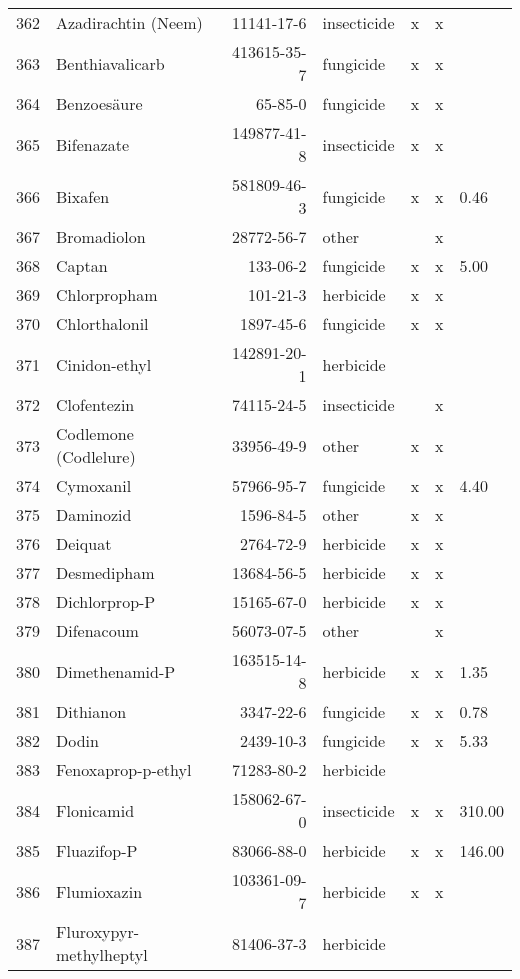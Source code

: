 \begin{longtable}{lp{3cm}rlp{0.5cm}p{0.5cm}p{1cm}}
  362 & Azadirachtin (Neem) & 11141-17-6 & insecticide & x & x &  \\ 
  363 & Benthiavalicarb & 413615-35-7 & fungicide & x & x &  \\ 
  364 & Benzoesäure & 65-85-0 & fungicide & x & x &  \\ 
  365 & Bifenazate & 149877-41-8 & insecticide & x & x &  \\ 
  366 & Bixafen & 581809-46-3 & fungicide & x & x & 0.46 \\ 
  367 & Bromadiolon & 28772-56-7 & other &  & x &  \\ 
  368 & Captan & 133-06-2 & fungicide & x & x & 5.00 \\ 
  369 & Chlorpropham & 101-21-3 & herbicide & x & x &  \\ 
  370 & Chlorthalonil & 1897-45-6 & fungicide & x & x &  \\ 
  371 & Cinidon-ethyl & 142891-20-1 & herbicide &  &  &  \\ 
  372 & Clofentezin & 74115-24-5 & insecticide &  & x &  \\ 
  373 & Codlemone (Codlelure) & 33956-49-9 & other & x & x &  \\ 
  374 & Cymoxanil & 57966-95-7 & fungicide & x & x & 4.40 \\ 
  375 & Daminozid & 1596-84-5 & other & x & x &  \\ 
  376 & Deiquat & 2764-72-9 & herbicide & x & x &  \\ 
  377 & Desmedipham & 13684-56-5 & herbicide & x & x &  \\ 
  378 & Dichlorprop-P & 15165-67-0 & herbicide & x & x &  \\ 
  379 & Difenacoum & 56073-07-5 & other &  & x &  \\ 
  380 & Dimethenamid-P & 163515-14-8 & herbicide & x & x & 1.35 \\ 
  381 & Dithianon & 3347-22-6 & fungicide & x & x & 0.78 \\ 
  382 & Dodin & 2439-10-3 & fungicide & x & x & 5.33 \\ 
  383 & Fenoxaprop-p-ethyl & 71283-80-2 & herbicide &  &  &  \\ 
  384 & Flonicamid & 158062-67-0 & insecticide & x & x & 310.00 \\ 
  385 & Fluazifop-P & 83066-88-0 & herbicide & x & x & 146.00 \\ 
  386 & Flumioxazin & 103361-09-7 & herbicide & x & x &  \\ 
  387 & Fluroxypyr-methylheptyl & 81406-37-3 & herbicide &  &  &  \\ 

\end{longtable}
